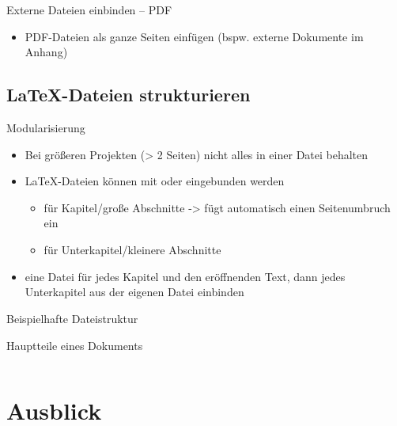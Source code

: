 \documentclass[presentation,aspectratio=169]{beamer}
\begin{document}
\begin{frame}[fragile]{Externe Dateien einbinden -- PDF}
  \begin{itemize}
    \item PDF-Dateien als ganze Seiten einfügen (bspw. externe Dokumente im Anhang)
  \end{itemize}
\end{frame}

\subsection{\LaTeX{}-Dateien strukturieren}

\begin{frame}[fragile]{Modularisierung}
  \begin{itemize}
    \item Bei größeren Projekten (> 2 Seiten) nicht alles in einer Datei behalten
    \item \LaTeX{}-Dateien können mit \verb|| oder \verb|| eingebunden werden
      \begin{itemize}
        \item \verb|| für Kapitel/große Abschnitte -> fügt automatisch einen Seitenumbruch ein
        \item \verb|| für Unterkapitel/kleinere Abschnitte
      \end{itemize}
    \item eine Datei für jedes Kapitel und den eröffnenden Text, dann jedes Unterkapitel aus der eigenen Datei einbinden
  \end{itemize}
\end{frame}

\begin{frame}[fragile]{Beispielhafte Dateistruktur}
  
\end{frame}

\begin{frame}[fragile]{Hauptteile eines Dokuments}
  \inputminted{latex}{codebeispiele/parts-of-document.tex}
\end{frame}

\section{Ausblick}
\end{document}
